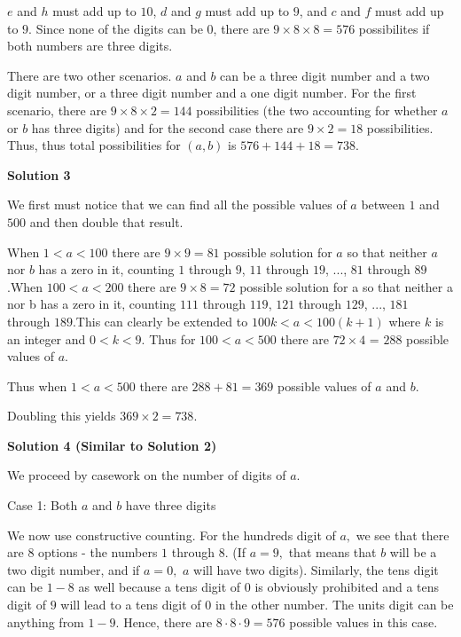 \begin{enumerate}
$e$ and $h$ must add up to $10$, $d$ and $g$ must add up to $9$, and $c$ and $f$ must add up to $9$. Since none of the digits can be 0, there are $9 \times 8 \times 8=576$ possibilites if both numbers are three digits.

 There are two other scenarios. $a$ and $b$ can be a three digit number and a two digit number, or a three digit number and a one digit number. For the first scenario, there are $9 \times 8 \times 2=144$ possibilities (the two accounting for whether $a$ or $b$ has three digits) and for the second case there are $9 \times 2=18$ possibilities. Thus, thus total possibilities for $(a,b)$ is $576+144+18=738$.

 



\textbf{Solution 3}

We first must notice that we can find all the possible values of $a$ between $1$ and $500$ and then double that result. 

 When $1 < a < 100$ there are $9\times9 = 81$ possible solution for $a$ so that neither $a$ nor $b$ has a zero in it, counting $1$ through $9$, $11$ through $19$, ..., $81$ through $89$.When $100 < a < 200$ there are $9\times8 =72$ possible solution for a so that neither a nor b has a zero in it, counting  $111$ through $119$, $121$ through $129$, ..., $181$ through $189$.This can clearly be extended to $100k < a < 100(k+1)$ where $k$ is an integer and $0 <k < 9$. Thus for $100 < a < 500$ there are $72\times4$ = $288$ possible values of $a$.

 Thus when $1 < a < 500$ there are $288 + 81 =369$ possible values of $a$ and $b$. 

 Doubling this yields $369\times2= 738$.

 



\textbf{Solution 4 (Similar to Solution 2)}

We proceed by casework on the number of digits of $a.$ 

 Case 1: Both $a$ and $b$ have three digits

 We now use constructive counting. For the hundreds digit of $a,$ we see that there are $8$ options - the numbers $1$ through $8.$ (If $a = 9,$ that means that $b$ will be a two digit number, and if $a = 0,$ $a$ will have two digits). Similarly, the tens digit can be $1-8$ as well because a tens digit of $0$ is obviously prohibited and a tens digit of $9$ will lead to a tens digit of $0$ in the other number. The units digit can be anything from $1-9.$ Hence, there are $8 \cdot 8 \cdot 9 = 576$ possible values in this case. 


\end{enumerate}
